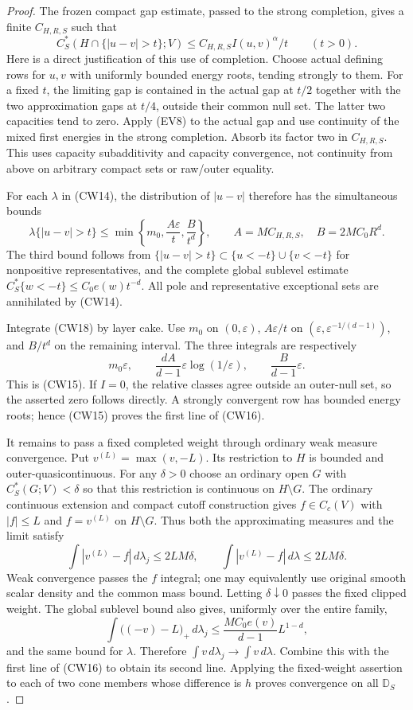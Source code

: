 \begin{proof}
The frozen compact gap estimate, passed to the strong
completion, gives a finite $C_{H,R,S}$ such that
\[
 C_S^*(H\cap\{|u-v|>t\};V)
       \leq C_{H,R,S} I(u,v)^\alpha/t\qquad(t>0).
 \tag{CW17}
\]
Here is a direct justification of this use of completion.
Choose actual defining rows for $u,v$ with uniformly
bounded energy roots, tending strongly to them. For a
fixed $t$, the limiting gap is contained in the actual
gap at $t/2$ together with the two approximation gaps
at $t/4$, outside their common null set. The latter
two capacities tend to zero. Apply (EV8) to the actual
gap and use continuity of the mixed first energies in
the strong completion. Absorb its factor two in
$C_{H,R,S}$. This uses capacity subadditivity and
capacity convergence, not continuity from above on
arbitrary compact sets or raw/outer equality.

For each $\lambda$ in (CW14), the distribution of
$|u-v|$ therefore has the simultaneous bounds
\[
 \lambda\{|u-v|>t\}
       \leq\min\left\{m_0,\frac{A\varepsilon}{t},
                            \frac{B}{t^d}\right\},
 \qquad A=MC_{H,R,S},\quad B=2MC_0R^d.
 \tag{CW18}
\]
The third bound follows from
$\{|u-v|>t\}\subset\{u<-t\}\cup\{v<-t\}$ for
nonpositive representatives, and the complete global
sublevel estimate $C_S^*\{w<-t\}\leq C_0e(w)t^{-d}$.
All pole and representative exceptional sets are
annihilated by (CW14).

Integrate (CW18) by layer cake. Use $m_0$ on
$(0,\varepsilon)$, $A\varepsilon/t$ on
$(\varepsilon,\varepsilon^{-1/(d-1)})$, and $B/t^d$
on the remaining interval. The three integrals are
respectively
\[
       m_0\varepsilon,\qquad
       \frac{dA}{d-1}\varepsilon\log(1/\varepsilon),
       \qquad \frac{B}{d-1}\varepsilon.
\]
This is (CW15). If $I=0$, the relative classes agree
outside an outer-null set, so the asserted zero follows
directly. A strongly convergent row has bounded energy
roots; hence (CW15) proves the first line of (CW16).

It remains to pass a fixed completed weight through
ordinary weak measure convergence. Put
$v^{(L)}=\max(v,-L)$. Its restriction to $H$ is bounded
and outer-quasicontinuous. For any $\delta>0$ choose
an ordinary open $G$ with $C_S^*(G;V)<\delta$ so
that this restriction is continuous on $H\setminus G$.
The ordinary continuous extension and compact cutoff
construction gives $f\in C_c(V)$ with $|f|\leq L$
and $f=v^{(L)}$ on $H\setminus G$. Thus both the
approximating measures and the limit satisfy
\[
       \int|v^{(L)}-f|\,d\lambda_j\leq2LM\delta,
       \qquad
       \int|v^{(L)}-f|\,d\lambda\leq2LM\delta.
\]
Weak convergence passes the $f$ integral; one may
equivalently use original smooth scalar density and
the common mass bound. Letting $\delta\downarrow0$
passes the fixed clipped weight. The global sublevel
bound also gives, uniformly over the entire family,
\[
 \int\bigl((-v)-L\bigr)_+\,d\lambda_j
       \leq\frac{MC_0e(v)}{d-1}L^{1-d},
\]
and the same bound for $\lambda$. Therefore
$\int v\,d\lambda_j\to\int v\,d\lambda$.
Combine this with the first line of (CW16) to obtain
its second line. Applying the fixed-weight assertion
to each of two cone members whose difference is $h$
proves convergence on all $\mathbb D_S$.


\end{proof}
